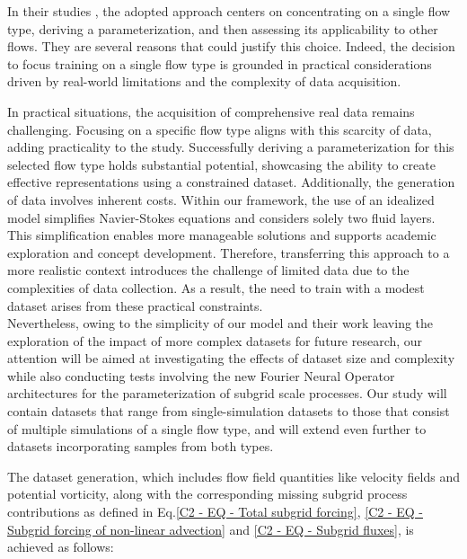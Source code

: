 In their studies \citep{FCNN1, Benchmarking, ClosureDataDrivenZanna}, the adopted approach centers on concentrating on a single flow type, deriving a parameterization, and then assessing its applicability to other flows. They are several reasons that could justify this choice. Indeed, the decision to focus training on a single flow type is grounded in practical considerations driven by real-world limitations and the complexity of data acquisition. 

\newpage

In practical situations, the acquisition of comprehensive real data remains challenging. Focusing on a specific flow type aligns with this scarcity of data, adding practicality to the study. Successfully deriving a parameterization for this selected flow type holds substantial potential, showcasing the ability to create effective representations using a constrained dataset. Additionally, the generation of data involves inherent costs. Within our framework, the use of an idealized model simplifies Navier-Stokes equations and considers solely two fluid layers. This simplification enables more manageable solutions and supports academic exploration and concept development. Therefore, transferring this approach to a more realistic context introduces the challenge of limited data due to the complexities of data collection. As a result, the need to train with a modest dataset arises from these practical constraints.\\

Nevertheless, owing to the simplicity of our model and their work leaving the exploration of the impact of more complex datasets for future research, our attention will be aimed at investigating the effects of dataset size and complexity while also conducting tests involving the new Fourier Neural Operator architectures for the parameterization of subgrid scale processes. Our study will contain datasets that range from single-simulation datasets to those that consist of multiple simulations of a single flow type, and will extend even further to datasets incorporating samples from both types.


The dataset generation, which includes flow field quantities like velocity fields and potential vorticity, along with the corresponding missing subgrid process contributions as defined in Eq.\ref{C2 - EQ - Total subgrid forcing}, \ref{C2 - EQ - Subgrid forcing of non-linear advection} and \ref{C2 - EQ - Subgrid fluxes}, is achieved as follows:

